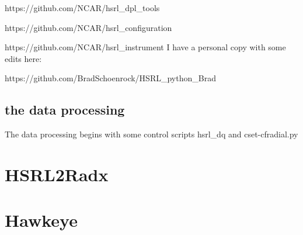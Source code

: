 \documentclass[a4paper,12pt]{article}
\begin{document}
https://github.com/NCAR/hsrl\_dpl\_tools

https://github.com/NCAR/hsrl\_configuration

https://github.com/NCAR/hsrl\_instrument
\newline
\newline
I have a personal copy with some edits here: 

https://github.com/BradSchoenrock/HSRL\_python\_Brad
\newline
\newline

\subsection{the data processing}
\label{SECTION-Data-Processing}

The data processing begins with some control scripts hsrl\_dq and cset-cfradial.py


\section{HSRL2Radx}
\label{SECTION-HSRL2Radx}


\section{Hawkeye}
\label{SECTION-Hawkeye}

\newpage


{}

\end{document}
